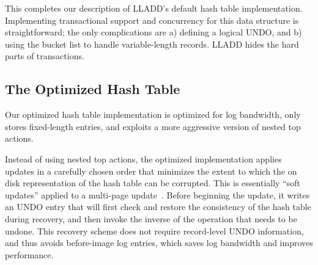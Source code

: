\documentclass[10pt,letterpaper,twocolumn,english]{article}
\newcommand{\yad}{LLADD\xspace}
\newcommand{\eab}[1]{\textcolor{red}{\bf EAB: #1}}
\begin{document}

This completes our description of \yad's default hash table
implementation.  Implementing
transactional support and concurrency for this data structure is
straightforward; the only complications are a) defining a logical
UNDO, and b) using the bucket list to handle variable-length records. \yad hides the hard parts of transactions.




\subsection{The Optimized Hash Table}
\label{optimizedHT}
Our optimized hash table implementation is optimized for log bandwidth,
only stores fixed-length entries, and exploits a more aggressive
version of nested top actions.

Instead of using nested top actions, the optimized implementation
applies updates in a carefully chosen order that minimizes the extent
to which the on disk representation of the hash table can be corrupted. 
This is essentially ``soft updates''
applied to a multi-page update~\cite{soft-updates}.  Before beginning
the update, it writes an UNDO entry that will first check and restore the
consistency of the hash table during recovery, and then invoke the
inverse of the operation that needs to be undone.  This recovery
scheme does not require record-level UNDO information, and thus avoids
before-image log entries, which saves log bandwidth and improves
performance.
\end{document}
